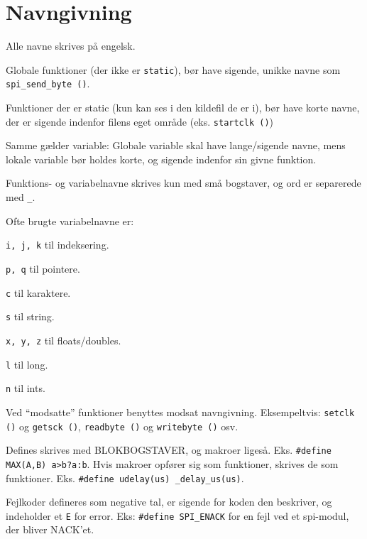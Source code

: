 \documentclass[article]{memoir}
\let\tempone\itemize
\let\temptwo\enditemize
\renewenvironment{itemize}{\tempone\firmlist}{\temptwo}
\begin{document}
\chapter{Navngivning}
\begin{itemize}
    \item Alle navne skrives på engelsk.
    \item Globale funktioner (der ikke er \texttt{static}), bør have sigende, unikke navne som \texttt{spi\_send\_byte ()}.
    \item Funktioner der er static (kun kan ses i den kildefil de er i), bør have korte navne, der er sigende indenfor filens eget område (eks. \texttt{startclk ()})
    \item Samme gælder variable: Globale variable skal have lange/sigende navne, mens lokale variable bør holdes korte, og sigende indenfor sin givne funktion.
    \item Funktions- og variabelnavne skrives kun med små bogstaver, og ord er separerede med \texttt{\_}.
    \item Ofte brugte variabelnavne er:
        \begin{itemize}
            \item \texttt{i, j, k} til indeksering.
            \item \texttt{p, q} til pointere.
            \item \texttt{c} til karaktere.
            \item \texttt{s} til string.
            \item \texttt{x, y, z} til floats/doubles.
            \item \texttt{l} til long.
            \item \texttt{n} til ints.
        \end{itemize}
    \item Ved ``modsatte'' funktioner benyttes modsat navngivning. Eksempeltvis: \texttt{setclk ()} og \texttt{getsck ()}, \texttt{readbyte ()} og \texttt{writebyte ()} osv.
    \item Defines skrives med BLOKBOGSTAVER, og makroer ligeså. Eks. \texttt{\#define MAX(A,B) a>b?a:b}. Hvis makroer opfører sig som funktioner, skrives de som funktioner. Eks. \texttt{\#define\ udelay(us) \_delay\_us(us)}.
    \item Fejlkoder defineres som negative tal, er sigende for koden den beskriver, og indeholder et \texttt{E} for error. Eks: \texttt{\#define SPI\_ENACK} for en fejl ved et spi-modul, der bliver NACK’et.
\end{itemize}
\end{document}

